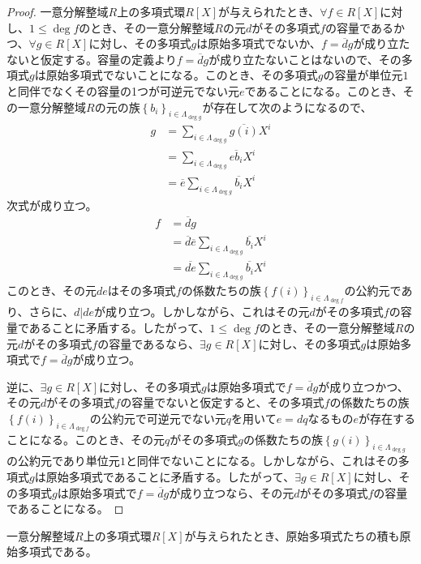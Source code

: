 \documentclass[dvipdfmx]{jsarticle}
\begin{document}
\begin{proof}
一意分解整域$R$上の多項式環$R[ X]$が与えられたとき、$\forall f \in R[ X]$に対し、$1 \leq \deg f$のとき、その一意分解整域$R$の元$d$がその多項式$f$の容量であるかつ、$\forall g \in R[ X]$に対し、その多項式$g$は原始多項式でないか、$f = \overline{d}g$が成り立たないと仮定する。容量の定義より$f = \overline{d}g$が成り立たないことはないので、その多項式$g$は原始多項式でないことになる。このとき、その多項式$g$の容量が単位元$1$と同伴でなくその容量の1つが可逆元でない元$e$であることになる。このとき、その一意分解整域$R$の元の族$\left\{ b_{i} \right\}_{i \in \varLambda_{\deg g}}$が存在して次のようになるので、
\begin{align*}
g &= \sum_{i \in \varLambda_{\deg g}} {\overline{g(i)}X^{i}} \\
&= \sum_{i \in \varLambda_{\deg g}} {\overline{eb_{i}}X^{i}} \\
&= \overline{e}\sum_{i \in \varLambda_{\deg g}} {\overline{b_{i}}X^{i}}
\end{align*}
次式が成り立つ。
\begin{align*}
f &= \overline{d}g \\
&= \overline{d}\overline{e}\sum_{i \in \varLambda_{\deg g}} {\overline{b_{i}}X^{i}} \\
&= \overline{de}\sum_{i \in \varLambda_{\deg g}} {\overline{b_{i}}X^{i}}
\end{align*}
このとき、その元$de$はその多項式$f$の係数たちの族$\left\{ f(i) \right\}_{i \in \varLambda_{\deg f}}$の公約元であり、さらに、$d|de$が成り立つ。しかしながら、これはその元$d$がその多項式$f$の容量であることに矛盾する。したがって、$1 \leq \deg f$のとき、その一意分解整域$R$の元$d$がその多項式$f$の容量であるなら、$\exists g \in R[ X]$に対し、その多項式$g$は原始多項式で$f = \overline{d}g$が成り立つ。\par
逆に、$\exists g \in R[ X]$に対し、その多項式$g$は原始多項式で$f = \overline{d}g$が成り立つかつ、その元$d$がその多項式$f$の容量でないと仮定すると、その多項式$f$の係数たちの族$\left\{ f(i) \right\}_{i \in \varLambda_{\deg f}}$の公約元で可逆元でない元$q$を用いて$e = dq$なるもの$e$が存在することになる。このとき、その元$q$がその多項式$g$の係数たちの族$\left\{ g(i) \right\}_{i \in \varLambda_{\deg g}}$の公約元であり単位元$1$と同伴でないことになる。しかしながら、これはその多項式$g$は原始多項式であることに矛盾する。したがって、$\exists g \in R[ X]$に対し、その多項式$g$は原始多項式で$f = \overline{d}g$が成り立つなら、その元$d$がその多項式$f$の容量であることになる。
\end{proof}
\begin{thm}\label{3.3.5.9}
一意分解整域$R$上の多項式環$R[ X]$が与えられたとき、原始多項式たちの積も原始多項式である。
\end{thm}
\end{document}
